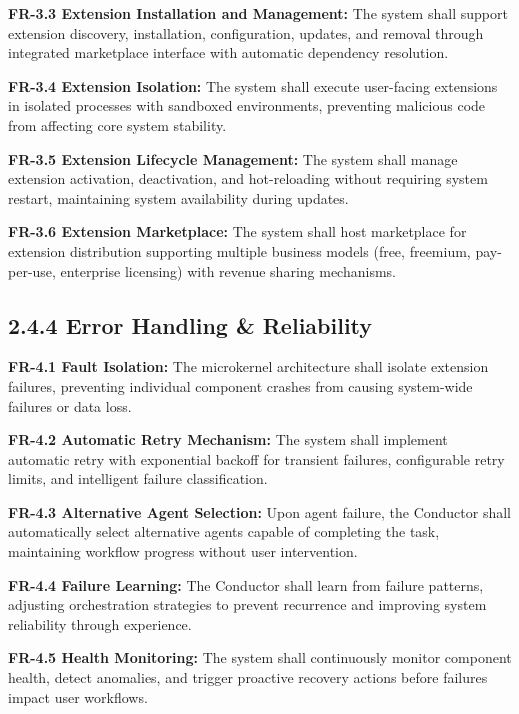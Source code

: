 \textbf{FR-3.3 Extension Installation and Management:}
The system shall support extension discovery, installation, configuration, updates, and removal through integrated marketplace interface with automatic dependency resolution.

\textbf{FR-3.4 Extension Isolation:}
The system shall execute user-facing extensions in isolated processes with sandboxed environments, preventing malicious code from affecting core system stability.

\textbf{FR-3.5 Extension Lifecycle Management:}
The system shall manage extension activation, deactivation, and hot-reloading without requiring system restart, maintaining system availability during updates.

\textbf{FR-3.6 Extension Marketplace:}
The system shall host marketplace for extension distribution supporting multiple business models (free, freemium, pay-per-use, enterprise licensing) with revenue sharing mechanisms.


\subsection*{2.4.4 Error Handling \& Reliability}
\label{sec:fr-reliability}

\textbf{FR-4.1 Fault Isolation:}
The microkernel architecture shall isolate extension failures, preventing individual component crashes from causing system-wide failures or data loss.

\textbf{FR-4.2 Automatic Retry Mechanism:}
The system shall implement automatic retry with exponential backoff for transient failures, configurable retry limits, and intelligent failure classification.

\textbf{FR-4.3 Alternative Agent Selection:}
Upon agent failure, the Conductor shall automatically select alternative agents capable of completing the task, maintaining workflow progress without user intervention.


\textbf{FR-4.4 Failure Learning:}
The Conductor shall learn from failure patterns, adjusting orchestration strategies to prevent recurrence and improving system reliability through experience.

\textbf{FR-4.5 Health Monitoring:}
The system shall continuously monitor component health, detect anomalies, and trigger proactive recovery actions before failures impact user workflows.

